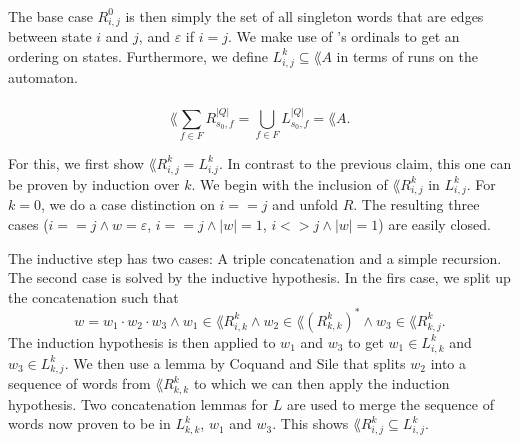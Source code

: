 \documentclass[11pt,a4paper,oneside]{book}
\begin{document}
                    \paragraph{}
                        The base case $R^{0}_{i,j}$ is then simply the set of all singleton words that are edges between state $i$ and $j$, and $\varepsilon$ if $i=j$. 
                        We make use of \ssreflect's ordinals to get an ordering on states. 
                        Furthermore, we define $L^k_{i,j} \subseteq \lang{A}$ in terms of runs on the automaton. 
                        \vspace{-0.3cm} 
                    
                    \paragraph{}
                        \begin{theorem} 
                        \[
                            \lang{\sum\limits_{f \in F} R^{|Q|}_{s_0, f}} = \bigcup\limits_{f \in F} L^{|Q|}_{s_0, f} = \lang{A}.
                        \]
                        \end{theorem}
                        For this, we first show $\lang{R^k_{i,j}} = L^k_{i.j}$. 
                        In contrast to the previous claim, this one can be proven by induction over $k$. 
                        We begin with the inclusion of $\lang{R^k_{i,j}}$ in $L^k_{i,j}$. 
                        For $k=0$, we do a case distinction on $i==j$ and unfold $R$. 
                        The resulting three cases ($i==j \wedge w=\varepsilon$, $i==j \wedge |w|=1$, $i<>j \wedge |w|=1$) are easily closed. 

                        The inductive step has two cases: A triple concatenation and a simple recursion. 
                        The second case is solved by the inductive hypothesis.
                        In the firs case, we split up the concatenation such that
                        \[
                            w = w_1 \cdot w_2 \cdot w_3 
                            \wedge w_1 \in \lang{R^k_{i,k}} 
                            \wedge w_2 \in \lang{(R^k_{k,k})^*} 
                            \wedge w_3 \in \lang{R^k_{k,j}}.
                        \]
                        The induction hypothesis is then applied to $w_1$ and $w_3$ to get $w_1 \in L^k_{i,k}$ and $w_3 \in L^k_{k,j}$.
                        We then use a lemma by Coquand and Sile that splits $w_2$ into a sequence of words from $\lang{R^k_{k,k}}$ to which we can then apply the induction hypothesis. 
                        Two concatenation lemmas for $L$ are used to merge the sequence of words now proven to be in $L^k_{k,k}$,
                        $w_1$ and $w_3$. This shows $\lang{R^k_{i,j}} \subseteq L^k_{i,j}$.
\end{document}
